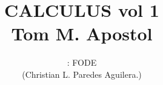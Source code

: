 \normalfont

\author{\Large : FODE \\ \small (Christian L. Paredes Aguilera.)}
\title{CALCULUS vol 1\\ \small Tom M. Apostol}
\date{}
\pagestyle{empty}
\maketitle
\thispagestyle{empty}
\let\cleardoublepage\clearpage
\tableofcontents								%


 
\let\cleardoublepage\clearpage
